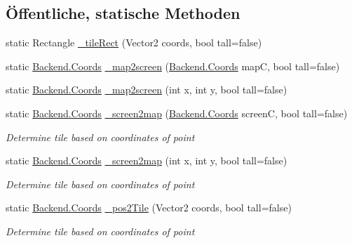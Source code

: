 \subsection*{Öffentliche, statische Methoden}
\begin{DoxyCompactItemize}
\item 
static Rectangle \hyperlink{class_gruppe22_1_1_client_1_1_mainmap_a4bb4a6696e30f92aa794948ec5bbac40}{\-\_\-tile\-Rect} (Vector2 coords, bool tall=false)
\item 
static \hyperlink{class_gruppe22_1_1_backend_1_1_coords}{Backend.\-Coords} \hyperlink{class_gruppe22_1_1_client_1_1_mainmap_a4284eda383663111f1ae9d35e32ddf36}{\-\_\-map2screen} (\hyperlink{class_gruppe22_1_1_backend_1_1_coords}{Backend.\-Coords} map\-C, bool tall=false)
\item 
static \hyperlink{class_gruppe22_1_1_backend_1_1_coords}{Backend.\-Coords} \hyperlink{class_gruppe22_1_1_client_1_1_mainmap_a3550c63a5b95bd95b2b8cc558ada4652}{\-\_\-map2screen} (int x, int y, bool tall=false)
\item 
static \hyperlink{class_gruppe22_1_1_backend_1_1_coords}{Backend.\-Coords} \hyperlink{class_gruppe22_1_1_client_1_1_mainmap_a8030ba7ebffc39ced0ca61ad6e8a5ff1}{\-\_\-screen2map} (\hyperlink{class_gruppe22_1_1_backend_1_1_coords}{Backend.\-Coords} screen\-C, bool tall=false)
\begin{DoxyCompactList}\small\item\em Determine tile based on coordinates of point \end{DoxyCompactList}\item 
static \hyperlink{class_gruppe22_1_1_backend_1_1_coords}{Backend.\-Coords} \hyperlink{class_gruppe22_1_1_client_1_1_mainmap_a709f8e5e62d8f603bdfc0f447b20982f}{\-\_\-screen2map} (int x, int y, bool tall=false)
\begin{DoxyCompactList}\small\item\em Determine tile based on coordinates of point \end{DoxyCompactList}\item 
static \hyperlink{class_gruppe22_1_1_backend_1_1_coords}{Backend.\-Coords} \hyperlink{class_gruppe22_1_1_client_1_1_mainmap_a4143327f197fcbda55723d6a7bb8dcfb}{\-\_\-pos2\-Tile} (Vector2 coords, bool tall=false)
\begin{DoxyCompactList}\small\item\em Determine tile based on coordinates of point \end{DoxyCompactList}\end{DoxyCompactItemize}
